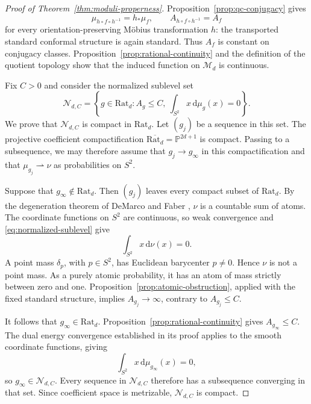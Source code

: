\documentclass[10pt,a4paper]{amsart}
\newcommand{\dd}{\mathrm d}
\numberwithin{equation}{section}
\begin{document}
\begin{proof}[Proof of Theorem~\ref{thm:moduli-properness}]
Proposition~\ref{prop:qc-conjugacy} gives
\begin{equation}\label{eq:mobius-moduli-invariance}
 \mu_{h\circ f\circ h^{-1}}=h_*\mu_f,
 \qquad A_{h\circ f\circ h^{-1}}=A_f
\end{equation}
for every orientation-preserving M\"obius transformation $h$: the transported standard conformal structure is again standard. Thus $A_f$ is constant on conjugacy classes. Proposition~\ref{prop:rational-continuity} and the definition of the quotient topology show that the induced function on $\mathcal M_d$ is continuous.

Fix $C>0$ and consider the normalized sublevel set
\begin{equation}\label{eq:normalized-sublevel}
 \mathcal N_{d,C}
 =\left\{g\in\mathrm{Rat}_d:A_g\le C,
             \ \int_{S^2}x\,\dd\mu_g(x)=0\right\}.
\end{equation}
We prove that $\mathcal N_{d,C}$ is compact in $\mathrm{Rat}_d$. Let $(g_j)$ be a sequence in this set. The projective coefficient compactification $\overline{\mathrm{Rat}_d}=\mathbb P^{2d+1}$ is compact. Passing to a subsequence, we may therefore assume that $g_j\to g_\infty$ in this compactification and that $\mu_{g_j}\rightharpoonup\nu$ as probabilities on $S^2$.

Suppose that $g_\infty\notin\mathrm{Rat}_d$. Then $(g_j)$ leaves every compact subset of $\mathrm{Rat}_d$. By the degeneration theorem of DeMarco and Faber \cite[Theorem A]{DF14}, $\nu$ is a countable sum of atoms. The coordinate functions on $S^2$ are continuous, so weak convergence and \eqref{eq:normalized-sublevel} give
\[
 \int_{S^2}x\,\dd\nu(x)=0.
\]
A point mass $\delta_p$, with $p\in S^2$, has Euclidean barycenter $p\ne0$. Hence $\nu$ is not a point mass. As a purely atomic probability, it has an atom of mass strictly between zero and one. Proposition~\ref{prop:atomic-obstruction}, applied with the fixed standard structure, implies $A_{g_j}\to\infty$, contrary to $A_{g_j}\le C$.

It follows that $g_\infty\in\mathrm{Rat}_d$. Proposition~\ref{prop:rational-continuity} gives $A_{g_\infty}\le C$. The dual energy convergence established in its proof applies to the smooth coordinate functions, giving
\[
 \int_{S^2}x\,\dd\mu_{g_\infty}(x)=0,
\]
so $g_\infty\in\mathcal N_{d,C}$. Every sequence in $\mathcal N_{d,C}$ therefore has a subsequence converging in that set. Since coefficient space is metrizable, $\mathcal N_{d,C}$ is compact.


\end{proof}
\end{document}
